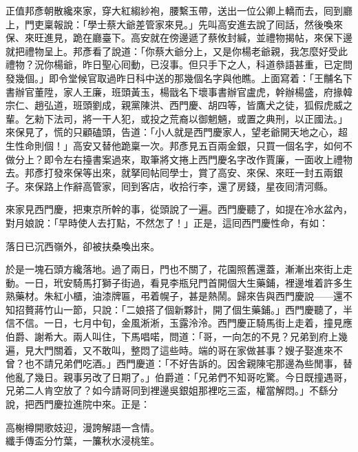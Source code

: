 正值邦彥朝散纔來家，穿大紅縐紗袍，腰繫玉帶，送出一位公卿上轎而去，囘到廳上，門吏稟報說：「學士蔡大爺差管家來見。」先叫高安進去說了囘話，然後喚來保、來旺進見，跪在廳臺下。高安就在傍邊遞了蔡攸封緘，並禮物揭帖，來保下邊就把禮物呈上。邦彥看了說道：「你蔡大爺分上，又是你楊老爺親，我怎麼好受此禮物？況你楊爺，昨日聖心囘動，已沒事。但只手下之人，科道叅語甚重，已定問發幾個。」即令堂候官取過昨日科中送的那幾個名字與他瞧。上面寫着：「王黼名下書辦官董陞，家人王廉，班頭黃玉，楊戩名下壞事書辦官盧虎，幹辦楊盛，府掾韓宗仁、趙弘道，班頭劉成，親黨陳洪、西門慶、胡四等，皆鷹犬之徒，狐假虎威之輩。乞勑下法司，將一干人犯，或投之荒裔以御魍魎，或置之典刑，以正國法。」來保見了，慌的只顧磕頭，告道：「小人就是西門慶家人，望老爺開天地之心，超生性命則個！」高安又替他跪稟一次。邦彥見五百兩金銀，只買一個名字，如何不做分上？即令左右擡書案過來，取筆將文捲上西門慶名字改作賈廉，{}一面收上禮物去。邦彥打發來保等出來，就拏囘帖囘學士，賞了高安、來保、來旺一封五兩銀子。來保路上作辭高管家，囘到客店，收拾行李，還了房錢，星夜囘清河縣。

來家見西門慶，把東京所幹的事，從頭說了一遍。西門慶聽了，如提在冷水盆內，對月娘說：「早時使人去打點，不然怎了！」正是，這囘西門慶性命，有如：

\begin{myquote}
落日已沉西嶺外，卻被扶桑喚出來。
\end{myquote}

於是一塊石頭方纔落地。過了兩日，門也不關了，花園照舊還蓋，漸漸出來街上走動。{}一日，玳安騎馬打獅子街過，看見李瓶兒門首開個大生藥鋪，裡邊堆着許多生熟藥材。朱紅小櫃，油漆牌匾，弔着幌子，甚是熱鬧。歸來告與西門慶說——還不知招贅蔣竹山一節，只說：「二娘搭了個新夥計，開了個生藥鋪。」{}西門慶聽了，半信不信。一日，七月中旬，金風淅淅，玉露泠泠。西門慶正騎馬街上走着，撞見應伯爵、謝希大。兩人叫住，下馬唱喏，問道：「哥，一向怎的不見？兄弟到府上幾遍，見大門關着，又不敢叫，整悶了這些時。端的哥在家做甚事？嫂子娶進來不曾？也不請兄弟們吃酒。」西門慶道：「不好告訴的。因舍親陳宅那邊為些閒事，替他亂了幾日。親事另改了日期了。」伯爵道：「兄弟們不知哥吃驚。今日既撞遇哥，兄弟二人肯空放了？如今請哥同到裡邊吳銀姐那裡吃三盃，權當解悶。」不繇分說，把西門慶拉進院中來。正是：

\begin{myquote}
高榭樽開歌妓迎，漫誇解語一含情。\\纖手傳盃分竹葉，一簾秋水浸桃笙。
\end{myquote}

